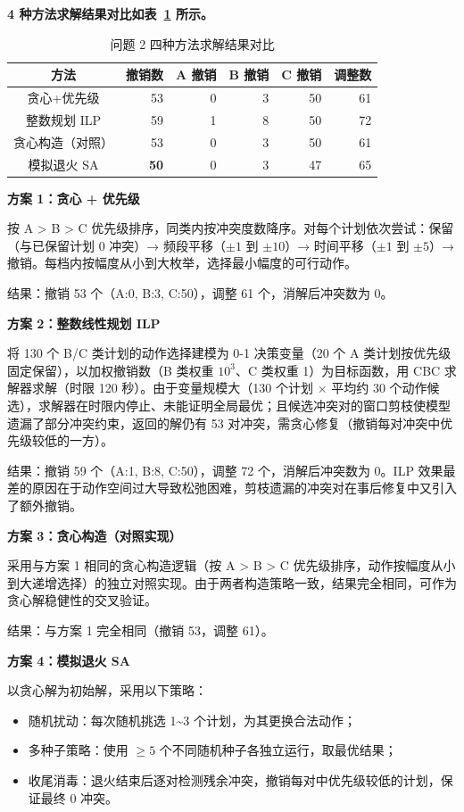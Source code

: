 
\textbf{4 种方法求解结果对比如表~\ref{tab:q2_compare} 所示。}

\begin{table}[htbp]
\centering
\caption{问题 2 四种方法求解结果对比}
\label{tab:q2_compare}
\begin{tabular}{crrrrr}
\toprule
方法 & 撤销数 & A 撤销 & B 撤销 & C 撤销 & 调整数 \\
\midrule
贪心+优先级 & 53 & 0 & 3 & 50 & 61 \\
整数规划 ILP & 59 & 1 & 8 & 50 & 72 \\
贪心构造（对照） & 53 & 0 & 3 & 50 & 61 \\
模拟退火 SA & \textbf{50} & 0 & 3 & 47 & 65 \\
\bottomrule
\end{tabular}
\end{table}

\textbf{方案 1：贪心 + 优先级}

按 A > B > C 优先级排序，同类内按冲突度数降序。对每个计划依次尝试：保留（与已保留计划 0 冲突）→ 频段平移（$\pm 1$ 到 $\pm 10$）→ 时间平移（$\pm 1$ 到 $\pm 5$）→ 撤销。每档内按幅度从小到大枚举，选择最小幅度的可行动作。

结果：撤销 53 个（A:0, B:3, C:50），调整 61 个，消解后冲突数为 0。

\textbf{方案 2：整数线性规划 ILP}

将 130 个 B/C 类计划的动作选择建模为 0-1 决策变量（20 个 A 类计划按优先级固定保留），以加权撤销数（B 类权重 $10^3$、C 类权重 1）为目标函数，用 CBC 求解器求解（时限 120 秒）。由于变量规模大（130 个计划 $\times$ 平均约 30 个动作候选），求解器在时限内停止、未能证明全局最优；且候选冲突对的窗口剪枝使模型遗漏了部分冲突约束，返回的解仍有 53 对冲突，需贪心修复（撤销每对冲突中优先级较低的一方）。

结果：撤销 59 个（A:1, B:8, C:50），调整 72 个，消解后冲突数为 0。ILP 效果最差的原因在于动作空间过大导致松弛困难，剪枝遗漏的冲突对在事后修复中又引入了额外撤销。

\textbf{方案 3：贪心构造（对照实现）}

采用与方案 1 相同的贪心构造逻辑（按 A > B > C 优先级排序，动作按幅度从小到大递增选择）的独立对照实现。由于两者构造策略一致，结果完全相同，可作为贪心解稳健性的交叉验证。

结果：与方案 1 完全相同（撤销 53，调整 61）。

\textbf{方案 4：模拟退火 SA}

以贪心解为初始解，采用以下策略：
\begin{itemize}
    \item 随机扰动：每次随机挑选 1\textasciitilde3 个计划，为其更换合法动作；
    \item 多种子策略：使用 $\geq 5$ 个不同随机种子各独立运行，取最优结果；
    \item 收尾消毒：退火结束后逐对检测残余冲突，撤销每对中优先级较低的计划，保证最终 0 冲突。
\end{itemize}


